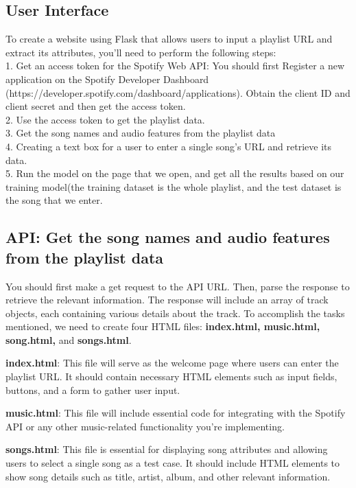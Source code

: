 \documentclass[titlepage]{article}
\begin{document}
\subsection{User Interface}
To create a website using Flask that allows users to input a playlist URL and extract its attributes, you'll need to perform the following steps:\\
1. Get an access token for the Spotify Web API:
You should first Register a new application on the Spotify Developer Dashboard (https://developer.spotify.com/dashboard/applications).
Obtain the client ID and client secret and then get the access token.\\
2. Use the access token to get the playlist data.\\
3. Get the song names and audio features from the playlist data\\
4. Creating a text box for a user to enter a single song's URL and retrieve its data.\\
5. Run the model on the page that we open, and get all the results based on our training model(the training dataset is the whole playlist, and the test dataset is the song that we enter.


\subsection{API: Get the song names and audio features from the playlist data}
You should first make a get request to the API URL. Then, parse the response to retrieve the relevant information. The response will include an array of track objects, each containing various details about the track. To accomplish the tasks mentioned, we need to create four HTML files: \textbf{index.html, music.html, song.html,} and \textbf{songs.html}.


\textbf{index.html}: This file will serve as the welcome page where users can enter the playlist URL. It should contain necessary HTML elements such as input fields, buttons, and a form to gather user input.

\textbf{music.html}: This file will include essential code for integrating with the Spotify API or any other music-related functionality you're implementing. 

\textbf{songs.html}: This file is essential for displaying song attributes and allowing users to select a single song as a test case. It should include HTML elements to show song details such as title, artist, album, and other relevant information.
\end{document}
